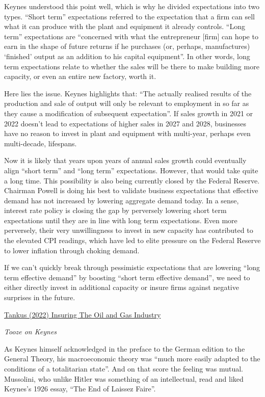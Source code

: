 \documentclass[
]{book}
\begin{document}
Keynes understood this point well, which is why he divided expectations into two types. ``Short term'' expectations referred to the expectation that a firm can sell what it can produce with the plant and equipment it already controls. ``Long term'' expectations are ``concerned with what the entrepreneur {[}firm{]} can hope to earn in the shape of future returns if he purchases (or, perhaps, manufactures) `finished' output as an addition to his capital equipment''. In other words, long term expectations relate to whether the sales will be there to make building more capacity, or even an entire new factory, worth it.

Here lies the issue. Keynes highlights that: ``The actually realised results of the production and sale of output will only be relevant to employment in so far as they cause a modification of subsequent expectation''. If sales growth in 2021 or 2022 doesn't lead to expectations of higher sales in 2027 and 2028, businesses have no reason to invest in plant and equipment with multi-year, perhaps even multi-decade, lifespans.

Now it is likely that years upon years of annual sales growth could eventually align ``short term'' and ``long term'' expectations. However, that would take quite a long time. This possibility is also being currently closed by the Federal Reserve. Chairman Powell is doing his best to validate business expectations that effective demand has not increased by lowering aggregate demand today. In a sense, interest rate policy is closing the gap by perversely lowering short term expectations until they are in line with long term expectations. Even more perversely, their very unwillingness to invest in new capacity has contributed to the elevated CPI readings, which have led to elite pressure on the Federal Reserve to lower inflation through choking demand.

If we can't quickly break through pessimistic expectations that are lowering ``long term effective demand'' by boosting ``short term effective demand'', we need to either directly invest in additional capacity or insure firms against negative surprises in the future.

\href{https://www.crisesnotes.com/is-insuring-the-oil-and-gas-industry-the-right-response-to-the-fallout-from-ukraine/}{Tankus (2022) Insuring The Oil and Gas Industry}

\emph{Tooze on Keynes}

As Keynes himself acknowledged in the preface to the German edition to the General Theory, his macroeconomic theory was ``much more easily adapted to the conditions of a totalitarian state''. And on that score the feeling was mutual. Mussolini, who unlike Hitler was something of an intellectual, read and liked Keynes's 1926 essay, ``The End of Laissez Faire''.
\end{document}
